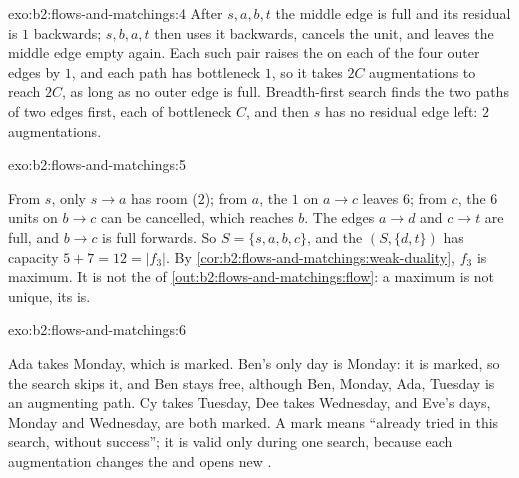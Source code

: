 \begin{solution}{exo:b2:flows-and-matchings:4}
After $s, a, b, t$ the middle edge is full and its residual is $1$ backwards; $s, b, a, t$ then uses it backwards,
cancels the unit, and leaves the middle edge empty again. Each such pair raises the  on each of the four outer
edges by $1$, and each path has bottleneck $1$, so it takes $2C$ augmentations to reach $2C$, as long as no outer edge is
full. Breadth-first search finds the two paths of two edges first, each of bottleneck $C$, and then $s$ has no residual
edge left: $2$ augmentations.
\end{solution}

\begin{solution}{exo:b2:flows-and-matchings:5}

From $s$, only $s \to a$ has room ($2$); from $a$, the  $1$ on $a \to c$ leaves $6$; from $c$, the $6$ units on $b
\to c$ can be cancelled, which reaches $b$. The edges $a \to d$ and $c \to t$ are full, and $b \to c$ is full forwards.
So $S = \{s, a, b, c\}$, and the  $(S, \{d, t\})$ has capacity $5 + 7 = 12 = |f_3|$. By
\cref{cor:b2:flows-and-matchings:weak-duality}, $f_3$ is maximum. It is not the  of
\cref{out:b2:flows-and-matchings:flow}: a maximum  is not unique, its  is.
\end{solution}

\begin{solution}{exo:b2:flows-and-matchings:6}

Ada takes Monday, which is marked. Ben's only day is Monday: it is marked, so the search skips it, and Ben stays free,
although Ben, Monday, Ada, Tuesday is an augmenting path. Cy takes Tuesday, Dee takes Wednesday, and Eve's days, Monday
and Wednesday, are both marked. A mark means ``already tried in this search, without success''; it is valid only during
one search, because each augmentation changes the  and opens new .
\end{solution}

